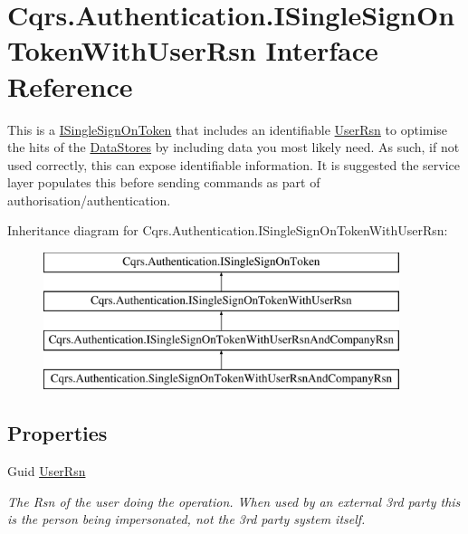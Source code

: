 \hypertarget{interfaceCqrs_1_1Authentication_1_1ISingleSignOnTokenWithUserRsn}{}\section{Cqrs.\+Authentication.\+I\+Single\+Sign\+On\+Token\+With\+User\+Rsn Interface Reference}
\label{interfaceCqrs_1_1Authentication_1_1ISingleSignOnTokenWithUserRsn}


This is a \hyperlink{interfaceCqrs_1_1Authentication_1_1ISingleSignOnToken}{I\+Single\+Sign\+On\+Token} that includes an identifiable \hyperlink{interfaceCqrs_1_1Authentication_1_1ISingleSignOnTokenWithUserRsn_a3ba8dbde50e032ebc76c96a5ff40f47f}{User\+Rsn} to optimise the hits of the \hyperlink{}{Data\+Stores} by including data you most likely need. As such, if not used correctly, this can expose identifiable information. It is suggested the service layer populates this before sending commands as part of authorisation/authentication.  


Inheritance diagram for Cqrs.\+Authentication.\+I\+Single\+Sign\+On\+Token\+With\+User\+Rsn\+:\begin{figure}[H]
\begin{center}
\leavevmode
\includegraphics[height=4.000000cm]{interfaceCqrs_1_1Authentication_1_1ISingleSignOnTokenWithUserRsn}
\end{center}
\end{figure}
\subsection*{Properties}
\begin{DoxyCompactItemize}
\item 
Guid \hyperlink{interfaceCqrs_1_1Authentication_1_1ISingleSignOnTokenWithUserRsn_a3ba8dbde50e032ebc76c96a5ff40f47f}{User\+Rsn}
\begin{DoxyCompactList}\small\item\em The Rsn of the user doing the operation. When used by an external 3rd party this is the person being impersonated, not the 3rd party system itself. \end{DoxyCompactList}\end{DoxyCompactItemize}
